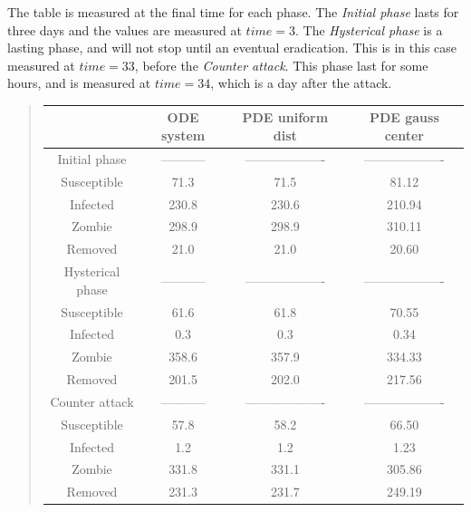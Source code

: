 \documentclass[%
twoside,                 %
final,                   %
10pt]{article}
\begin{document}
The table is measured at the final time for each phase. The \emph{Initial phase} lasts for three days and the values are measured at $time=3$. The \emph{Hysterical phase} is a lasting phase, and will not stop until an eventual eradication. This is in this case measured at $time=33$, before the \emph{Counter attack}. This phase last for some hours, and is measured at $time=34$, which is a day after the attack. 

\label{table:compare_phases_zombie}

\begin{quote}
\begin{tabular}{cccc}
\hline
\multicolumn{1}{c}{  } & \multicolumn{1}{c}{ ODE system } & \multicolumn{1}{c}{ PDE uniform dist } & \multicolumn{1}{c}{ PDE gauss center } \\
\hline
Initial phase       & -----------         & ------------------- & ------------------- \\
\hline
Susceptible         & 71.3                & 71.5                & 81.12               \\
Infected            & 230.8               & 230.6               & 210.94              \\
Zombie              & 298.9               & 298.9               & 310.11              \\
Removed             & 21.0                & 21.0                & 20.60               \\
\hline
Hysterical phase    & -----------         & ------------------- & ------------------- \\
\hline
Susceptible         & 61.6                & 61.8                & 70.55               \\
Infected            & 0.3                 & 0.3                 & 0.34                \\
Zombie              & 358.6               & 357.9               & 334.33              \\
Removed             & 201.5               & 202.0               & 217.56              \\
\hline
Counter attack      & -----------         & ------------------- & ------------------- \\
\hline
Susceptible         & 57.8                & 58.2                & 66.50               \\
Infected            & 1.2                 & 1.2                 & 1.23                \\
Zombie              & 331.8               & 331.1               & 305.86              \\
Removed             & 231.3               & 231.7               & 249.19              \\
\hline
\end{tabular}
\end{quote}
\end{document}
